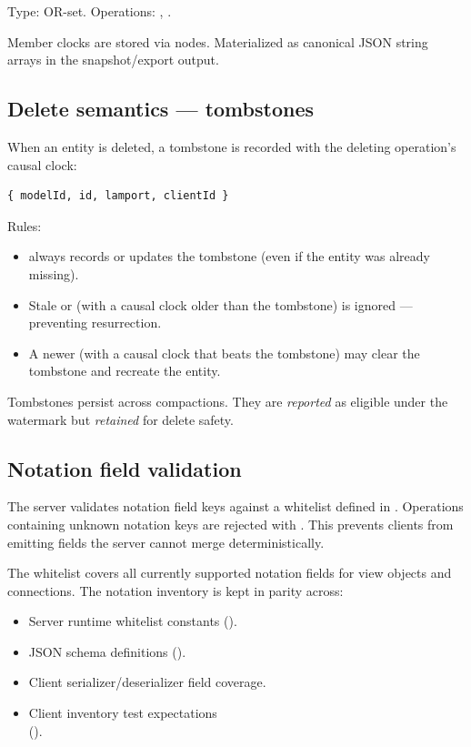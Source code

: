 Type: OR-set. Operations: ,
.

Member clocks are stored via  nodes.
Materialized as canonical JSON string arrays in the snapshot/export output.

\subsection{Delete semantics --- tombstones}

When an entity is deleted, a tombstone is recorded with the deleting
operation's causal clock:

\begin{lstlisting}[caption={Tombstone record}]
{ modelId, id, lamport, clientId }
\end{lstlisting}

Rules:

\begin{itemize}
\item {} always records or updates the tombstone (even if the
  entity was already missing).
\item Stale  or  (with a causal clock older
  than the tombstone) is ignored --- preventing resurrection.
\item A newer  (with a causal clock that beats the tombstone)
  may clear the tombstone and recreate the entity.
\end{itemize}

Tombstones persist across compactions. They are \emph{reported} as eligible
under the watermark but \emph{retained} for delete safety.

\subsection{Notation field validation}

The server validates notation field keys against a whitelist defined in
. Operations containing unknown notation keys are
rejected with . This prevents clients from
emitting fields the server cannot merge deterministically.

The whitelist covers all currently supported notation fields for view objects
and connections. The notation inventory is kept in parity across:

\begin{itemize}
\item Server runtime whitelist constants ().
\item JSON schema definitions ().
\item Client serializer/deserializer field coverage.
\item Client inventory test expectations \\
  ().
\end{itemize}

